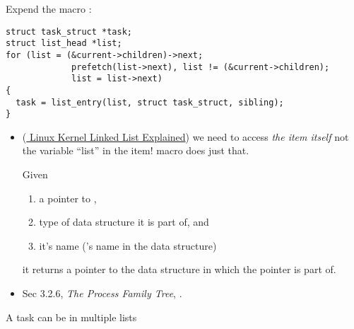 Expend the macro :
\begin{center}
  \begin{minipage}{.6\linewidth}
\begin{verbatim}
struct task_struct *task;
struct list_head *list;
for (list = (&current->children)->next;
             prefetch(list->next), list != (&current->children);
             list = list->next)
{
  task = list_entry(list, struct task_struct, sibling);
}
\end{verbatim}  
  \end{minipage}
\end{center}

\begin{itemize}
\item (\href{http://isis.poly.edu/kulesh/stuff/src/klist/}{%
    Linux Kernel Linked List Explained}) we need to access \emph{the item itself} not the
  variable ``list'' in the item! macro  does just that.
  \begin{center}
  \end{center}
  Given
  \begin{enumerate}
  \item a pointer to ,
  \item type of data structure it is part of, and
  \item it's name ('s name in the data structure)
  \end{enumerate}
  it returns a pointer to the data structure in which the pointer is part of.
\item Sec 3.2.6, \emph{The Process Family Tree}, \cite{love2010linux}.
\end{itemize}

\begin{frame}
  \begin{block}{A task can be in multiple lists}
    \begin{center}
    \end{center}
  \end{block}
\end{frame}


